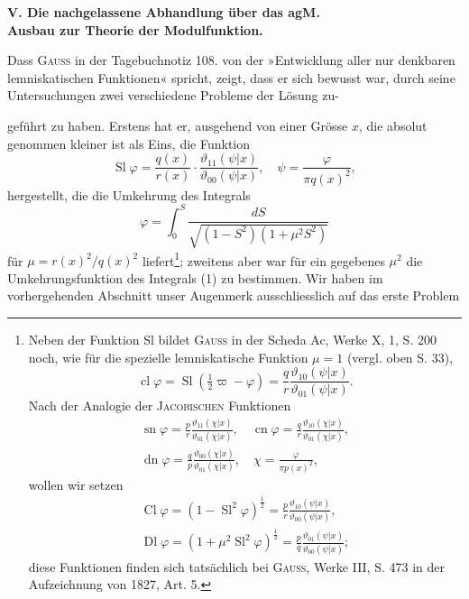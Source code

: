 \par\medskip
\begin{center}\bfseries
V. Die nachgelassene Abhandlung über das agM.\\
Ausbau zur Theorie der Modulfunktion.
\end{center}
\begin{center}\end{center}
\noindent\hspace*{\parindent}Dass \textsc{Gauss} in der Tagebuchnotiz 108. von der »Entwicklung aller nur
denkbaren lemniskatischen Funktionen« spricht, zeigt, dass er sich bewusst
war, durch seine Untersuchungen zwei verschiedene Probleme der Lösung zu-\par
\clearpage{}
\noindent geführt zu haben. Erstens hat er, ausgehend von einer Grösse \(x\), die absolut
genommen kleiner ist als Eins, die Funktion
\[
\operatorname{Sl}\varphi=\frac{q(x)}{r(x)}\cdot\frac{\vartheta_{11}(\psi|x)}{\vartheta_{00}(\psi|x)},\quad
\psi=\frac{\varphi}{\pi q(x)^2},
\]
\noindent hergestellt, die die Umkehrung des Integrals
\begingroup\makeatletter\tagsleft@true\let\veqno\leqno\makeatother
\begin{equation*}
\varphi=\int_0^S\frac{dS}{\sqrt{(1-S^2)(1+\mu^2S^2)}}\tag{1}
\end{equation*}
\endgroup
\noindent für \(\mu=r(x)^2/q(x)^2\) liefert\footnote{Neben der Funktion Sl bildet \textsc{Gauss} in der Scheda Ac, Werke X, 1, S. 200 noch, wie für die spezielle lemniskatische Funktion \(\mu=1\) (vergl. oben S. 33),
\[
\operatorname{cl}\varphi=\operatorname{Sl}(\tfrac12\varpi-\varphi)=\frac qr\frac{\vartheta_{10}(\psi|x)}{\vartheta_{01}(\psi|x)}.
\]
Nach der Analogie der \textsc{Jacobischen} Funktionen
\[
\begin{gathered}
\operatorname{sn}\varphi=\frac pr\frac{\vartheta_{11}(\chi|x)}{\vartheta_{01}(\chi|x)},\quad
\operatorname{cn}\varphi=\frac qr\frac{\vartheta_{10}(\chi|x)}{\vartheta_{01}(\chi|x)},\\
\operatorname{dn}\varphi=\frac qp\frac{\vartheta_{00}(\chi|x)}{\vartheta_{01}(\chi|x)},\quad
\chi=\frac{\varphi}{\pi p(x)^2},
\end{gathered}
\]
wollen wir setzen
\[
\begin{gathered}
\operatorname{Cl}\varphi=(1-\operatorname{Sl}^2\varphi)^{\frac12}=\frac pr\frac{\vartheta_{10}(\psi|x)}{\vartheta_{00}(\psi|x)},\\
\operatorname{Dl}\varphi=(1+\mu^2\operatorname{Sl}^2\varphi)^{\frac12}=\frac pq\frac{\vartheta_{01}(\psi|x)}{\vartheta_{00}(\psi|x)};
\end{gathered}
\]
diese Funktionen finden sich tatsächlich bei \textsc{Gauss}, Werke III, S. 473 in der Aufzeichnung von 1827, Art. 5.}; zweitens aber war für ein gegebenes \(\mu^2\) die Umkehrungsfunktion des Integrals (1) zu bestimmen. Wir haben im vorhergehenden Abschnitt unser Augenmerk ausschliesslich auf das erste Problem
